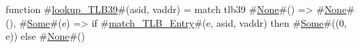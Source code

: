 function #\hyperref[sailRISCVzlookupzyTLB39]{lookup\_TLB39}#(asid, vaddr) =
  match tlb39 {
    #\hyperref[sailRISCVzNone]{None}#()  => #\hyperref[sailRISCVzNone]{None}#(),
    #\hyperref[sailRISCVzSome]{Some}#(e) => if #\hyperref[sailRISCVzmatchzyTLBzyEntry]{match\_TLB\_Entry}#(e, asid, vaddr) then #\hyperref[sailRISCVzSome]{Some}#((0, e)) else #\hyperref[sailRISCVzNone]{None}#()
  }
